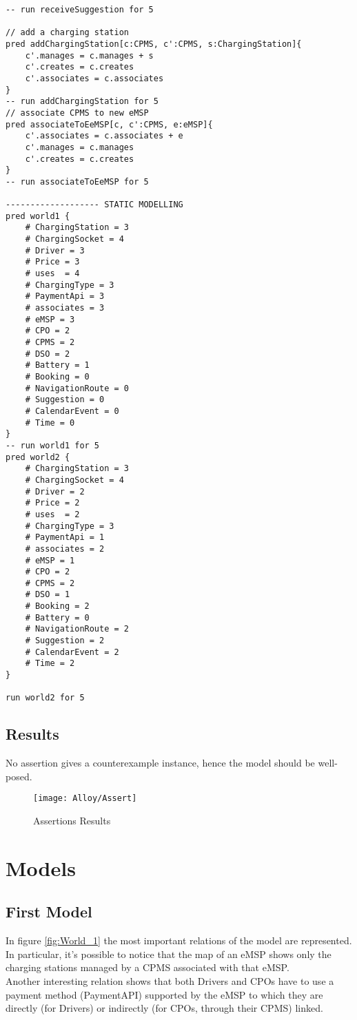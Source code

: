\begin{lstlisting}[language=alloy]
-- run receiveSuggestion for 5

// add a charging station
pred addChargingStation[c:CPMS, c':CPMS, s:ChargingStation]{
    c'.manages = c.manages + s
    c'.creates = c.creates
    c'.associates = c.associates
}
-- run addChargingStation for 5
// associate CPMS to new eMSP
pred associateToEeMSP[c, c':CPMS, e:eMSP]{
    c'.associates = c.associates + e
    c'.manages = c.manages
    c'.creates = c.creates
}
-- run associateToEeMSP for 5

------------------- STATIC MODELLING
pred world1 {
    # ChargingStation = 3
    # ChargingSocket = 4
    # Driver = 3
    # Price = 3
    # uses  = 4
    # ChargingType = 3
    # PaymentApi = 3
    # associates = 3
    # eMSP = 3
    # CPO = 2
    # CPMS = 2
    # DSO = 2
    # Battery = 1
    # Booking = 0
    # NavigationRoute = 0
    # Suggestion = 0
    # CalendarEvent = 0
    # Time = 0
}
-- run world1 for 5
pred world2 {
    # ChargingStation = 3
    # ChargingSocket = 4
    # Driver = 2
    # Price = 2
    # uses  = 2
    # ChargingType = 3
    # PaymentApi = 1
    # associates = 2
    # eMSP = 1
    # CPO = 2
    # CPMS = 2
    # DSO = 1
    # Booking = 2
    # Battery = 0
    # NavigationRoute = 2
    # Suggestion = 2
    # CalendarEvent = 2
    # Time = 2
}

run world2 for 5
\end{lstlisting}
\newpage
\subsection{Results}
\label{subsec:results}
No assertion gives a counterexample instance, hence the model should be well-posed.
\begin{figure}[H]
    \begin{center}
    \texttt{[image: Alloy/Assert]}
    \caption{Assertions Results}
    \label{fig:AssertionsResults}
    \end{center}
\end{figure}
\section{Models}
\label{sec:models}
\subsection{First Model}
\label{subsec:firstModel}
In figure \ref{fig:World_1} the most important relations of the model are represented. In particular, it's possible to notice that the map of an eMSP shows only the charging stations managed by a CPMS associated with that eMSP. \\
Another interesting relation shows that both Drivers and CPOs have to use a payment method (PaymentAPI) supported by the eMSP to which they are directly (for Drivers) or indirectly (for CPOs, through their CPMS) linked.
